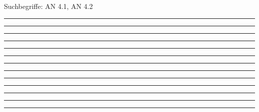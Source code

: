 \documentclass[a4paper,12pt]{report}
\begin{document}

 \scriptsize Suchbegriffe: AN 4.1, AN 4.2\normalsize 
 
%
\hrule  \leer

%
\hrule  \leer

%
\hrule  \leer

%
\hrule  \leer

%
\hrule  \leer

%
\hrule  \leer

%
\hrule  \leer

%
\hrule  \leer

%
\hrule  \leer

%
\hrule  \leer

%
\hrule  \leer

%
\hrule  \leer

%
\hrule  \leer

\end{document}
